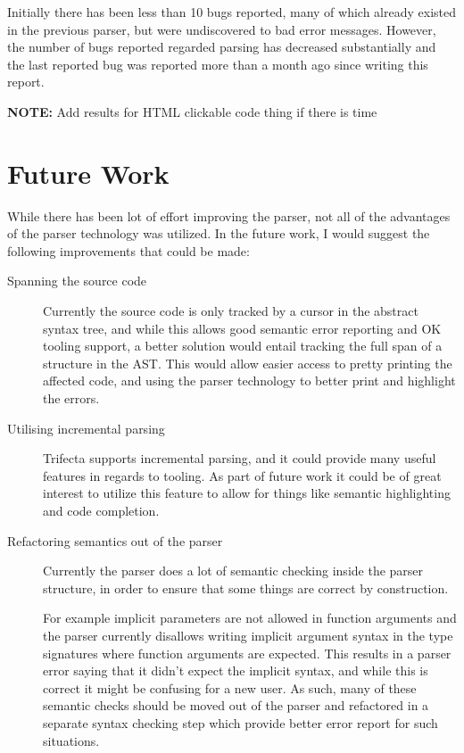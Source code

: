 \documentclass[a4paper]{article}%
\begin{document}
Initially there has been less than 10 bugs reported, many of which already existed in the previous parser, but were undiscovered to bad error messages.
However, the number of bugs reported regarded parsing has decreased substantially and the last reported bug was reported more than a month ago since writing this report.

\textbf{NOTE:} Add results for HTML clickable code thing if there is time


\section{Future Work}
\label{sec:FutureWork}
While there has been lot of effort improving the parser, not all of the advantages of the parser technology was utilized.
In the future work, I would suggest the following improvements that could be made:

\begin{description}
  \item[Spanning the source code] Currently the source code is only tracked by a cursor in the abstract syntax tree, and while this allows good semantic error reporting and OK tooling support,
        a better solution would entail tracking the full span of a structure in the AST. This would allow easier access to pretty printing the affected code, and
        using the parser technology to better print and highlight the errors.
  \item[Utilising incremental parsing] Trifecta supports incremental parsing, and it could provide many useful features in regards to tooling. As part of future work
                                       it could be of great interest to utilize this feature to allow for things like semantic highlighting and code completion.
  \item[Refactoring semantics out of the parser] Currently the parser does a lot of semantic checking inside the parser structure, in order to ensure
                                                 that some things are correct by construction.

                                                 For example implicit parameters are not allowed in function arguments
                                                 and the parser currently disallows writing implicit argument syntax in the type signatures where function arguments
                                                 are expected. This results in a parser error saying that it didn't expect the implicit syntax, and while this is correct
                                                 it might be confusing for a new user. As such, many of these semantic checks should be moved out of the parser and
                                                 refactored in a separate syntax checking step which provide better error report for such situations.
\end{description}
\end{document}
